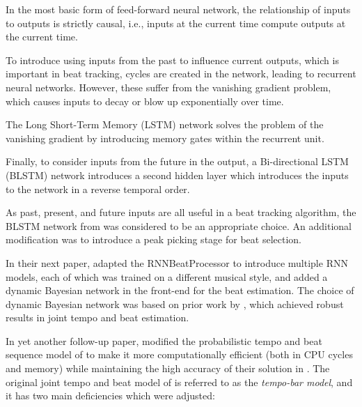 \documentclass[letter,12pt,notitlepage]{article}
\newenvironment{tight_itemize}{
\begin{itemize}
  \setlength{\itemsep}{0pt}
  \setlength{\parskip}{0pt}
}{\end{itemize}}
\begin{document}
\begin{tight_itemize}
	\vspace{-0.25em}
	\item
		In the most basic form of feed-forward neural network, the relationship of inputs to outputs is strictly causal, i.e., inputs at the current time compute outputs at the current time.
	\item
		To introduce using inputs from the past to influence current outputs, which is important in beat tracking, cycles are created in the network, leading to recurrent neural networks. However, these suffer from the vanishing gradient problem, which causes inputs to decay or blow up exponentially over time.
	\item
		The Long Short-Term Memory (LSTM) network solves the problem of the vanishing gradient by introducing memory gates within the recurrent unit.
	\item
		Finally, to consider inputs from the future in the output, a Bi-directional LSTM (BLSTM) network introduces a second hidden layer which introduces the inputs to the network in a reverse temporal order.
\end{tight_itemize}

As past, present, and future inputs are all useful in a beat tracking algorithm, the BLSTM network from \textcite{rnnonset} was considered to be an appropriate choice. An additional modification was to introduce a peak picking stage for beat selection.

In their next paper, \textcite{bock3} adapted the RNNBeatProcessor to introduce multiple RNN models, each of which was trained on a different musical style, and added a dynamic Bayesian network in the front-end for the beat estimation. The choice of dynamic Bayesian network was based on prior work by \textcite{whiteley}, which achieved robust results in joint tempo and beat estimation.

In yet another follow-up paper, \textcite{bock2} modified the probabilistic tempo and beat sequence model of \cite{whiteley} to make it more computationally efficient (both in CPU cycles and memory) while maintaining the high accuracy of their solution in \cite{bock3}. The original joint tempo and beat model of \textcite{whiteley} is referred to as the \textit{tempo-bar model}, and it has two main deficiencies which were adjusted:
\end{document}
